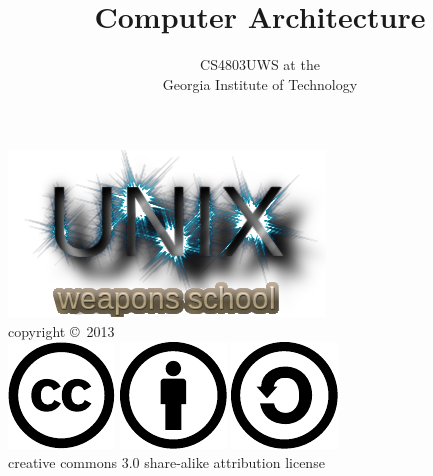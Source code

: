 \documentclass[mathserif,xcolor={dvipsnames,table}]{beamer}
\title{\textbf{Computer Architecture}}
\date{}
\author{CS4803UWS at the\\
Georgia Institute of Technology
}
\begin{document}
\begin{frame}
\titlepage
\begin{center}
\includegraphics[scale=0.33]{images/uws.png}\\
\vspace{.1in}
\tiny{copyright \copyright\ 2013}\\
\includegraphics[scale=.25]{images/cc-logo.pdf}
\includegraphics[scale=.25]{images/cc-new.pdf}
\includegraphics[scale=.25]{images/cc-share.pdf}\\
\tiny{creative commons 3.0 share-alike attribution license}
\end{center}
\end{frame}
\end{document}

